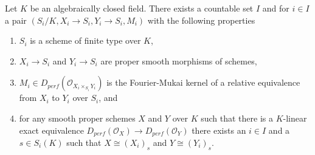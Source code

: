 \begin{lemma}
\label{lemma-countable-equivs}
Let $K$ be an algebraically closed field. There exists a countable set $I$
and for $i \in I$ a pair $(S_i/K, X_i \to S_i, Y_i \to S_i, M_i)$
with the following properties
\begin{enumerate}
\item $S_i$ is a scheme of finite type over $K$,
\item $X_i \to S_i$ and $Y_i \to S_i$ are proper smooth
morphisms of schemes,
\item $M_i \in D_{perf}(\mathcal{O}_{X_i \times_{S_i} Y_i})$
is the Fourier-Mukai kernel of a relative equivalence from
$X_i$ to $Y_i$ over $S_i$, and
\item for any smooth proper schemes $X$ and $Y$ over $K$
such that there is a $K$-linear exact equivalence
$D_{perf}(\mathcal{O}_X) \to D_{perf}(\mathcal{O}_Y)$
there exists an $i \in I$ and a $s \in S_i(K)$
such that $X \cong (X_i)_s$ and $Y \cong (Y_i)_s$.
\end{enumerate}
\end{lemma}

